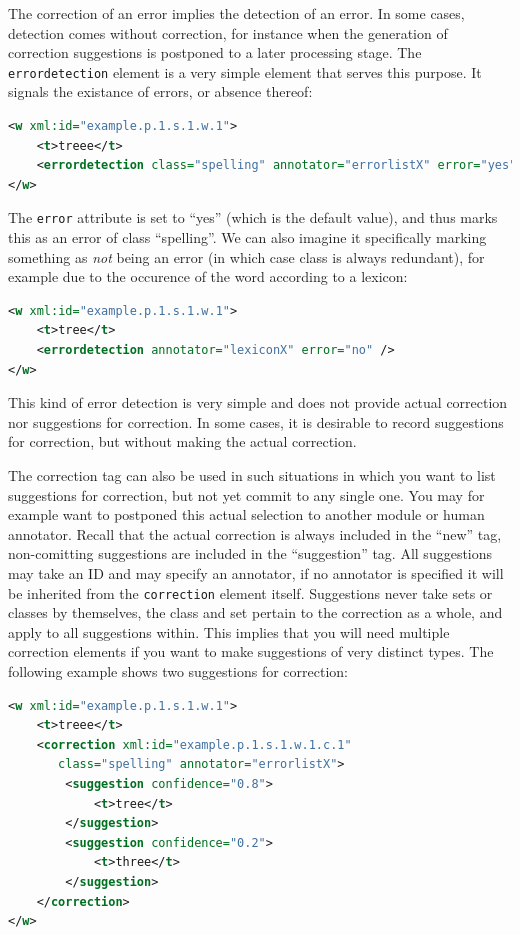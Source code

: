\documentclass[a4paper,12pt]{report}
\begin{document}
The correction of an error implies the detection of an error. In some cases, detection comes without correction, for instance when the generation of correction suggestions is postponed to a later processing stage. The \texttt{errordetection} element is a very simple element that serves this purpose. It signals the existance of errors, or absence thereof:

\begin{lstlisting}[language=xml]
<w xml:id="example.p.1.s.1.w.1">
    <t>treee</t>
    <errordetection class="spelling" annotator="errorlistX" error="yes" />
</w>    
\end{lstlisting}

The \texttt{error} attribute is set to ``yes'' (which is the default value), and thus marks this as an error of class ``spelling''. We can also imagine it specifically marking something as \emph{not} being an error (in which case class is always redundant), for example due to the occurence of the word according to a lexicon:

\begin{lstlisting}[language=xml]
<w xml:id="example.p.1.s.1.w.1">
    <t>tree</t>
    <errordetection annotator="lexiconX" error="no" />
</w>    
\end{lstlisting}

This kind of error detection is very simple and does not provide actual correction nor suggestions for correction. In some cases, it is desirable to record suggestions for correction, but without making the actual correction.

The correction tag can also be used in such situations in which you want to list suggestions for correction, but not yet commit to any single one. You may for example want to postponed this actual selection to another module or human annotator. Recall that the actual correction is always included in the ``new'' tag, non-comitting suggestions are included in the ``suggestion'' tag. All suggestions may take an ID and may specify an annotator, if no annotator is specified it will be inherited from the \texttt{correction} element itself. Suggestions never take sets or classes by themselves, the class and set pertain to the correction as a whole, and apply to all suggestions within. This implies that you will need multiple correction elements if you want to make suggestions of very distinct types. The following example shows two suggestions for correction:
 
\begin{lstlisting}[language=xml]
<w xml:id="example.p.1.s.1.w.1">
    <t>treee</t>
    <correction xml:id="example.p.1.s.1.w.1.c.1"
       class="spelling" annotator="errorlistX">
        <suggestion confidence="0.8">
            <t>tree</t>
        </suggestion>
        <suggestion confidence="0.2">
            <t>three</t>
        </suggestion>
    </correction>
</w>    
\end{lstlisting}
\end{document}
